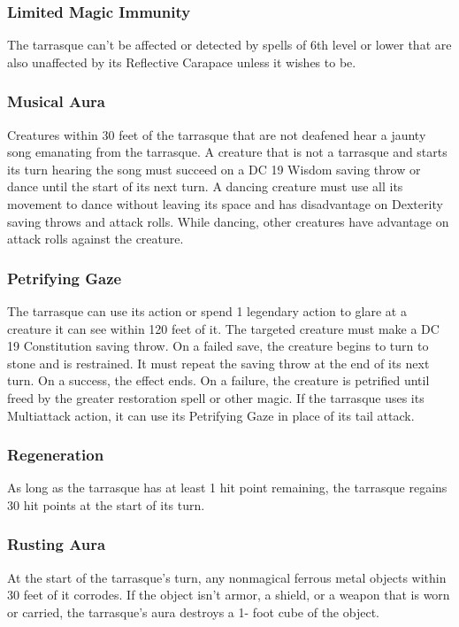 \documentclass[10pt,a4paper,twoside,bg=print,twocolumn,openany,nodeprecatedcode]{dndbook}
\begin{document}
\subsubsection{Limited Magic Immunity}
The tarrasque can't be affected or detected by spells of 6th level or lower that are also unaffected by its Reflective Carapace unless it wishes to be.

\subsubsection{Musical Aura}
Creatures within 30 feet of the tarrasque that are not deafened hear a jaunty song emanating from the tarrasque. A creature that is not a tarrasque and starts its turn hearing the song must succeed on a DC 19 Wisdom saving throw or dance until the start of its next turn. A dancing creature must use all its movement to dance without leaving its space and has disadvantage on Dexterity saving throws and attack rolls. While dancing, other creatures have advantage on attack rolls against the creature.

\subsubsection{Petrifying Gaze}
The tarrasque can use its action or spend 1 legendary action to glare at a creature it can see within 120 feet of it. The targeted creature must make a DC 19 Constitution saving throw. On a failed save, the creature begins to turn to stone and is restrained. It must repeat the saving throw at the end of its next turn. On a success, the effect ends. On a failure, the creature is petrified until freed by the greater restoration spell or other magic. If the tarrasque uses its Multiattack action, it can use its Petrifying Gaze in place of its tail attack.

\subsubsection{Regeneration}
As long as the tarrasque has at least 1 hit point remaining, the tarrasque regains 30 hit points at the start of its turn.

\subsubsection{Rusting Aura}
At the start of the tarrasque's turn, any nonmagical ferrous metal objects within 30 feet of it corrodes. If the object isn't armor, a shield, or a weapon that is worn or carried, the tarrasque's aura destroys a 1- foot cube of the object.
\end{document}
